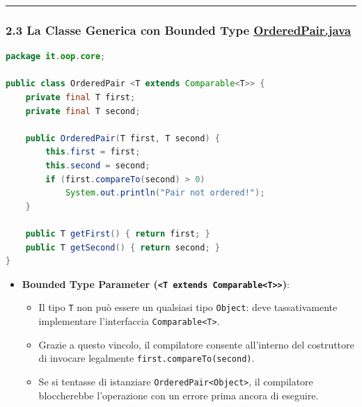 \documentclass[11pt,a4paper]{article}
\newcommand{\passthrough}[1]{#1}
\providecommand{\tightlist}{\setlength{\itemsep}{0pt}\setlength{\parskip}{0pt}}
\begin{document}
\begin{center}\rule{0.5\linewidth}{0.5pt}\end{center}

\subsubsection{\texorpdfstring{2.3 La Classe Generica con Bounded Type
\href{file:///home/wally/Documenti/GitHub/Programmazione-II/25-26/Teoria-e-Esercitazioni/Codice-20260902/Lezione14/MavenDate/src/main/java/it/oop/core/OrderedPair.java}{OrderedPair.java}}{2.3 La Classe Generica con Bounded Type OrderedPair.java}}\label{la-classe-generica-con-bounded-type-orderedpair.java}

\begin{lstlisting}[language=Java]
package it.oop.core;

public class OrderedPair <T extends Comparable<T>> {
    private final T first;
    private final T second;

    public OrderedPair(T first, T second) {
        this.first = first;
        this.second = second;
        if (first.compareTo(second) > 0)
            System.out.println("Pair not ordered!");
    }

    public T getFirst() { return first; }
    public T getSecond() { return second; }
}
\end{lstlisting}

\begin{itemize}
\tightlist
\item
  \textbf{Bounded Type Parameter
  (\passthrough{\lstinline!<T extends Comparable<T>>!})}:

  \begin{itemize}
  \tightlist
  \item
    Il tipo \passthrough{\lstinline!T!} non può essere un qualsiasi tipo
    \passthrough{\lstinline!Object!}: deve tassativamente implementare
    l'interfaccia \passthrough{\lstinline!Comparable<T>!}.
  \item
    Grazie a questo vincolo, il compilatore consente all'interno del
    costruttore di invocare legalmente
    \passthrough{\lstinline!first.compareTo(second)!}.
  \item
    Se si tentasse di istanziare
    \passthrough{\lstinline!OrderedPair<Object>!}, il compilatore
    bloccherebbe l'operazione con un errore prima ancora di eseguire.
  \end{itemize}
\end{itemize}
\end{document}

